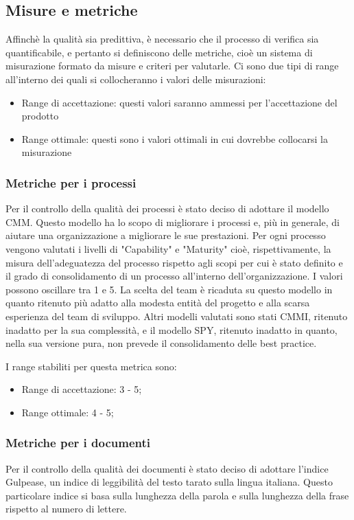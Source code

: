 	\subsection{Misure e metriche}
	Affinchè la qualità sia predittiva, è necessario che il processo di verifica sia quantificabile, e pertanto si definiscono delle metriche, cioè un sistema di misurazione formato da misure e criteri per valutarle.
	Ci sono due tipi di range all'interno dei quali si collocheranno i valori delle misurazioni:
	\begin{itemize}
		\item Range di accettazione: questi valori saranno ammessi per l'accettazione del prodotto
		\item Range ottimale: questi sono i valori ottimali in cui dovrebbe collocarsi la misurazione
	\end{itemize}
	\subsubsection{Metriche per i processi}
		Per il controllo della qualità dei processi è stato deciso di adottare il modello CMM. Questo modello ha lo scopo di migliorare i processi e, più in generale, di aiutare una organizzazione a migliorare le sue prestazioni.
		Per ogni processo vengono valutati i livelli di "Capability" e "Maturity" cioè, rispettivamente, la misura dell'adeguatezza del processo  rispetto agli scopi per cui è stato definito e il grado di consolidamento di un processo all'interno dell'organizzazione. I valori possono oscillare tra 1 e 5.
		La scelta del team è ricaduta su questo modello in quanto ritenuto più adatto alla modesta entità del progetto e alla scarsa esperienza del team di sviluppo. Altri modelli valutati sono stati CMMI, ritenuto inadatto per la sua complessità, e il modello SPY, ritenuto inadatto in quanto, nella sua versione pura, non prevede il consolidamento delle best practice.
		
		I range stabiliti per questa metrica sono:
		\begin{itemize}
			\item Range di accettazione: 3 - 5;
			\item Range ottimale: 4 - 5;
		\end{itemize}	
	\subsubsection{Metriche per i documenti}
		Per il controllo della qualità dei documenti è stato deciso di adottare l'indice Gulpease, un indice di leggibilità del testo tarato sulla lingua italiana.
		Questo particolare indice si basa sulla lunghezza della parola e sulla lunghezza della frase rispetto al numero di lettere.
		

